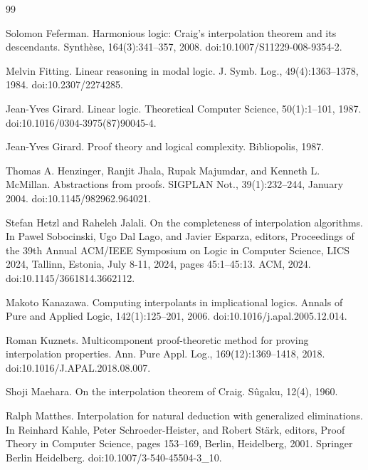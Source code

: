 \begin{thebibliography}{99}
\par\noindent    Solomon Feferman.  Harmonious logic: Craig’s interpolation theorem and its descendants.  Synthèse, 164(3):341–357, 2008.  doi:10.1007/S11229-008-9354-2.  

\par\noindent    Melvin Fitting.  Linear reasoning in modal logic.  J. Symb. Log., 49(4):1363–1378, 1984.  doi:10.2307/2274285.  

\par\noindent    Jean-Yves Girard.  Linear logic.  Theoretical Computer Science, 50(1):1–101, 1987.  doi:10.1016/0304-3975(87)90045-4.  

\par\noindent    Jean-Yves Girard.  Proof theory and logical complexity.  Bibliopolis, 1987.  

\par\noindent    Thomas A. Henzinger, Ranjit Jhala, Rupak Majumdar, and Kenneth L. McMillan.  Abstractions from proofs.  SIGPLAN Not., 39(1):232–244, January 2004.  doi:10.1145/982962.964021.  

\par\noindent    Stefan Hetzl and Raheleh Jalali.  On the completeness of interpolation algorithms.  In Pawel Sobocinski, Ugo Dal Lago, and Javier Esparza, editors, Proceedings of the 39th Annual ACM/IEEE Symposium on Logic in Computer Science, LICS 2024, Tallinn, Estonia, July 8-11, 2024, pages 45:1–45:13. ACM, 2024.  doi:10.1145/3661814.3662112.  

\par\noindent    Makoto Kanazawa.  Computing interpolants in implicational logics.  Annals of Pure and Applied Logic, 142(1):125–201, 2006.  doi:10.1016/j.apal.2005.12.014.  

\par\noindent    Roman Kuznets.  Multicomponent proof-theoretic method for proving interpolation properties.  Ann. Pure Appl. Log., 169(12):1369–1418, 2018.  doi:10.1016/J.APAL.2018.08.007.  

\par\noindent    Shoji Maehara.  On the interpolation theorem of Craig.  Sûgaku, 12(4), 1960.  

\par\noindent    Ralph Matthes.  Interpolation for natural deduction with generalized eliminations.  In Reinhard Kahle, Peter Schroeder-Heister, and Robert Stärk, editors, Proof Theory in Computer Science, pages 153–169, Berlin, Heidelberg, 2001. Springer Berlin Heidelberg.  doi:10.1007/3-540-45504-3\_10.  


\end{thebibliography}
